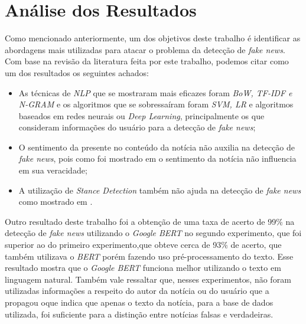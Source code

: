 \section{Análise dos Resultados}




Como mencionado anteriormente, um dos objetivos deste trabalho é identificar as abordagens mais utilizadas para atacar o problema da detecção de \textit{fake news}. Com base na revisão da literatura feita por este trabalho, podemos citar como um dos resultados os seguintes achados:
\begin{itemize}
\item  As técnicas  de \textit{NLP} que se mostraram mais eficazes foram \textit{BoW, TF-IDF e N-GRAM} e os algoritmos que se sobressaíram foram \textit{SVM, LR} e algoritmos baseados em redes neurais ou \textit{Deep Learning}, principalmente os que consideram informações do usuário para a detecção de \textit{fake news};  
\item O sentimento da presente no conteúdo da notícia não auxilia na detecção de \textit{fake news}, pois como foi mostrado em \citep{baarir2020} o sentimento da notícia não influencia em sua veracidade; 
\item A utilização de \textit{Stance Detection} também não ajuda na detecção de \textit{fake news} como mostrado em \citep{DeMagistris2022}.
\end{itemize}

Outro resultado deste trabalho foi a obtenção de uma taxa de acerto de 99\% na detecção de \textit{fake news} utilizando o \textit{Google BERT} no segundo experimento, que foi superior ao do primeiro experimento,que obteve cerca de 93\% de acerto, que também utilizava o \textit{BERT} porém fazendo uso pré-processamento do texto. Esse resultado mostra que o \textit{Google BERT} funciona melhor utilizando o texto em linguagem natural. Também vale ressaltar que, nesses experimentos, não foram utilizadas informações a respeito do autor da notícia ou do usuário que a propagou oque indica que apenas o texto da notícia, para a base de dados utilizada, foi suficiente para a distinção entre notícias falsas e verdadeiras. 

